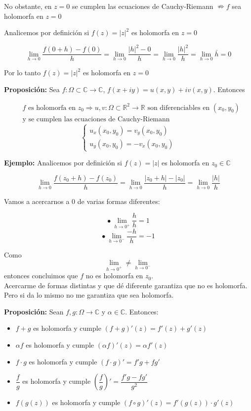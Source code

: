 \documentclass[a4paper,12pt]{article}
\begin{document}
No obstante, en $z = 0$ se cumplen las ecuaciones de Cauchy-Riemann $\nRightarrow f$ sea holomorfa en $z = 0$

Analicemos por definición si $f(z) = |z|^2$ es holomorfa en $z = 0$

\[
\lim_{h \to 0} \frac{f(0 + h) - f(0)}{h} = \lim_{h \to 0} \frac{|h|^2 - 0}{h} = \lim_{h \to 0} \frac{|h|^2}{h} = \lim_{h \to 0} \bar{h} = 0
\]

Por lo tanto $f(z) = |z|^2$ es holomorfa en $z = 0$

\textbf{Proposición:} Sea $f: \Omega \subset \mathbb{C} \rightarrow \mathbb{C}$, $f(x + iy) = u(x, y) + i v(x, y)$. Entonces

\[
\begin{aligned}
& f \text{ es holomorfa en } z_0 \Rightarrow u, v : \Omega \subset \mathbb{R}^2 \to \mathbb{R} \text{ son diferenciables en } (x_0, y_0) \\
& \text{y se cumplen las ecuaciones de Cauchy-Riemann}
\end{aligned}
\]
\[
\begin{cases}
u_x(x_0, y_0) = v_y(x_0, y_0) \\
u_y(x_0, y_0) = -v_x(x_0, y_0)
\end{cases}
\]

\textbf{Ejemplo:} Analicemos por definición si $f(z) = |z|$ es holomorfa en $z_0 \in \mathbb{C}$

\[
\lim_{h \to 0} \frac{f(z_0 + h) - f(z_0)}{h} = \lim_{h \to 0} \frac{|z_0 + h| - |z_0|}{h} = \lim_{h \to 0} \frac{|h|}{h}
\]

Vamos a acercarnos a $0$ de varias formas diferentes:

\[
\bullet \ \lim_{h \to 0^+} \frac{h}{h} = 1
\]
\[
\bullet \ \lim_{h \to 0^-} \frac{-h}{h} = -1
\]

Como 
\[
\lim_{h \to 0^+} \neq \lim_{h \to 0^-}
\]
entonces concluimos que $f$ no es holomorfa en $z_0$.\\

Acercarme de formas distintas y que dé diferente garantiza que no es holomorfa.  
Pero si da lo mismo no me garantiza que sea holomorfa.

\textbf{Proposición:} Sean $f, g : \Omega \rightarrow \mathbb{C}$ y $\alpha \in \mathbb{C}$. Entonces:

\begin{itemize}
    \item $f + g$ es holomorfa y cumple $(f + g)'(z) = f'(z) + g'(z)$
    \item $\alpha f$ es holomorfa y cumple $(\alpha f)'(z) = \alpha f'(z)$
    \item $f \cdot g$ es holomorfa y cumple $(f \cdot g)' = f' g + f g'$
    \item $\dfrac{f}{g}$ es holomorfa y cumple $\left(\dfrac{f}{g}\right)' = \dfrac{f' g - f g'}{g^2}$
    \item $f(g(z))$ es holomorfa y cumple $(f \circ g)'(z) = f'(g(z)) \cdot g'(z)$
\end{itemize}
\end{document}
